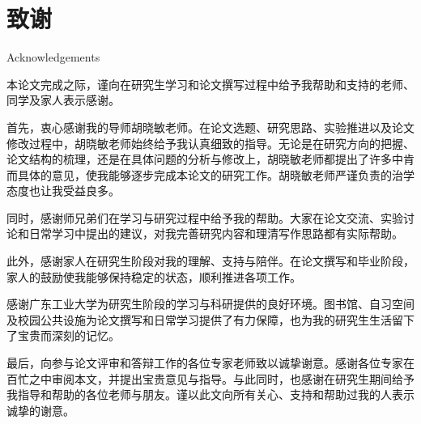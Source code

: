 \chapter{致谢}{Acknowledgements}

本论文完成之际，谨向在研究生学习和论文撰写过程中给予我帮助和支持的老师、同学及家人表示感谢。

首先，衷心感谢我的导师胡晓敏老师。在论文选题、研究思路、实验推进以及论文修改过程中，胡晓敏老师始终给予我认真细致的指导。无论是在研究方向的把握、论文结构的梳理，还是在具体问题的分析与修改上，胡晓敏老师都提出了许多中肯而具体的意见，使我能够逐步完成本论文的研究工作。胡晓敏老师严谨负责的治学态度也让我受益良多。

同时，感谢师兄弟们在学习与研究过程中给予我的帮助。大家在论文交流、实验讨论和日常学习中提出的建议，对我完善研究内容和理清写作思路都有实际帮助。

此外，感谢家人在研究生阶段对我的理解、支持与陪伴。在论文撰写和毕业阶段，家人的鼓励使我能够保持稳定的状态，顺利推进各项工作。

感谢广东工业大学为研究生阶段的学习与科研提供的良好环境。图书馆、自习空间及校园公共设施为论文撰写和日常学习提供了有力保障，也为我的研究生生活留下了宝贵而深刻的记忆。

最后，向参与论文评审和答辩工作的各位专家老师致以诚挚谢意。感谢各位专家在百忙之中审阅本文，并提出宝贵意见与指导。与此同时，也感谢在研究生期间给予我指导和帮助的各位老师与朋友。谨以此文向所有关心、支持和帮助过我的人表示诚挚的谢意。
